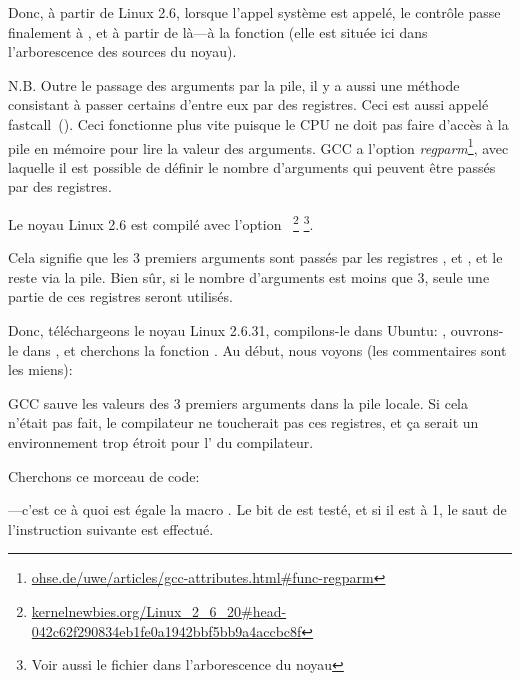 Donc, à partir de Linux 2.6, lorsque l'appel système  est appelé, le
contrôle passe finalement à , et à partir de là---à la fonction
 (elle est située ici  dans l'arborescence des
sources du noyau).

\newcommand{\URLREGPARM}{\href{http://go.yurichev.com/17040}{ohse.de/uwe/articles/gcc-attributes.html\#func-regparm}}

\label{regparm}
N.B. Outre le passage des arguments par la pile, il y a aussi une méthode consistant
à passer certains d'entre eux par des registres. Ceci est aussi appelé fastcall~().
Ceci fonctionne plus vite puisque le CPU ne doit pas faire d'accès à la pile en mémoire
pour lire la valeur des arguments.
GCC a l'option \emph{regparm}\footnote{\URLREGPARM}, avec laquelle il est possible
de définir le nombre d'arguments qui peuvent être passés par des registres.

\newcommand{\URLKERNELNEWB}{\href{http://go.yurichev.com/17066}{kernelnewbies.org/Linux\_2\_6\_20\#head-042c62f290834eb1fe0a1942bbf5bb9a4accbc8f}}
\newcommand{\CALLINGHFILE}{arch/x86/include/asm/calling.h}

Le noyau Linux 2.6 est compilé avec l'option ~\footnote{\URLKERNELNEWB}
\footnote{Voir aussi le fichier \TT{\CALLINGHFILE} dans l'arborescence du noyau}.

Cela signifie que les 3 premiers arguments sont passés par les registres \EAX, \EDX
et \ECX, et le reste via la pile.
Bien sûr, si le nombre d'arguments est moins que 3, seule une partie de ces registres
seront utilisés.

Donc, téléchargeons le noyau Linux 2.6.31, compilons-le dans Ubuntu: ,
ouvrons-le dans \IDA, et cherchons la fonction . Au début, nous
voyons (les commentaires sont les miens):



GCC sauve les valeurs des 3 premiers arguments dans la pile locale.
Si cela n'était pas fait, le compilateur ne toucherait pas ces registres, et ça serait
un environnement trop étroit pour l'
du compilateur.

Cherchons ce morceau de code:



---c'est ce à quoi est égale la macro .
Le bit  de  est testé, et si il est à 1, le saut de l'instruction
\JNZ suivante est effectué.

